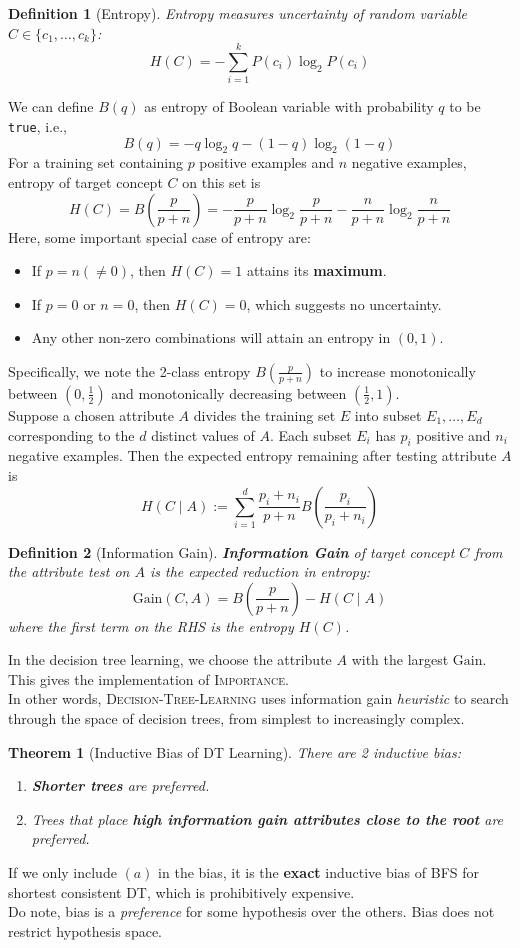 \documentclass[12pt]{article}
\newtheorem{definition}{Definition}[section]
\newtheorem{theorem}{Theorem}[section]
\theoremstyle{definition}
\begin{document}
\begin{definition}[Entropy]
\normalfont Entropy measures uncertainty of random variable $C\in\{c_1,\ldots, c_k\}$:
\[
H(C)=-\sum_{i=1}^k P(c_i)\log_2 P(c_i)
\]
\end{definition}
We can define $B(q)$ as entropy of Boolean variable with probability $q$ to be \texttt{true}, i.e.,
\[
B(q)=-q\log_2 q-(1-q)\log_2(1-q)
\]
For a training set containing $p$ positive examples and $n$ negative examples, entropy of target concept $C$ on this set is
\[
H(C)=B(\frac{p}{p+n})=-\frac{p}{p+n}\log_2\frac{p}{p+n}-\frac{n}{p+n}\log_2\frac{n}{p+n}
\]
Here, some important special case of entropy are:
\begin{itemize}
	\item If $p=n(\neq 0)$, then $H(C)=1$ attains its \textbf{maximum}.
	\item If $p=0$ or $n=0$, then $H(C)=0$, which suggests no uncertainty.
	\item Any other non-zero combinations will attain an entropy in $(0,1)$.
\end{itemize}
Specifically, we note the 2-class entropy $B(\frac{p}{p+n})$ to increase monotonically between $(0,\frac{1}{2})$ and monotonically decreasing between $(\frac{1}{2},1)$.\\
Suppose a chosen attribute $A$ divides the training set $E$ into subset $E_1,\ldots, E_d$ corresponding to the $d$ distinct values of $A$. Each subset $E_i$ has $p_i$ positive and $n_i$ negative examples. Then the expected entropy remaining after testing attribute $A$ is 
\[
H(C\mid A):=\sum_{i=1}^d\frac{p_i+n_i}{p+n}B(\frac{p_i}{p_i+n_i})
\]
\begin{definition}[Information Gain]
\normalfont \textbf{Information Gain} of target concept $C$ from the attribute test on $A$ is the expected reduction in entropy:
\[
\mathrm{Gain}(C,A)=B(\frac{p}{p+n})-H(C\mid A)
\]
where the first term on the RHS is the entropy $H(C)$.
\end{definition}
In the decision tree learning, we choose the attribute $A$ with the largest $\mathrm{Gain}$. This gives the implementation of \textsc{Importance}.\\
In other words, \textsc{Decision-Tree-Learning} uses information gain \textit{heuristic} to search through the space of decision trees, from simplest to increasingly complex.
\begin{theorem}[Inductive Bias of DT Learning]
\normalfont There are 2 inductive bias:
\begin{enumerate}
	\item \textbf{Shorter trees} are preferred.
	\item Trees that place \textbf{high information gain attributes close to the root} are preferred.
\end{enumerate}
\end{theorem}
If we only include $(a)$ in the bias, it is the \textbf{exact} inductive bias of BFS for shortest consistent DT, which is prohibitively expensive.\\
Do note, bias is a \textit{preference} for some hypothesis over the others. Bias does not restrict hypothesis space.
\end{document}
